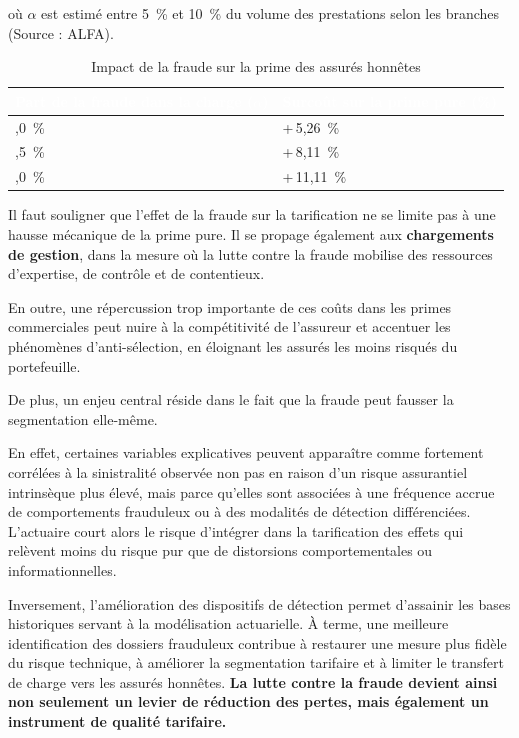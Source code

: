 où $\alpha$ est estimé entre 5~\% et 10~\% du volume des prestations selon les branches (Source : ALFA).

\begin{table}[H]
    \centering
    \renewcommand{\arraystretch}{1.4}
    \begin{tabularx}{\textwidth}{|>{\centering\arraybackslash}X|>{\centering\arraybackslash}X|}
        \hline
        \rowcolor{accenture}
        \textcolor{white}{\textbf{Part de la fraude dans la charge ($\alpha$)}} & \textcolor{white}{\textbf{Surcoût sur la prime pure (\%)}} \\
        \hline
        5,0~\% & +\,5,26~\% \\
        \hline
        7,5~\% & +\,8,11~\% \\
        \hline
        10,0~\% & +\,11,11~\% \\
        \hline
    \end{tabularx}
    \caption{Impact de la fraude sur la prime des assurés honnêtes}
    \label{tab:levier-fraude}
\end{table}

Il faut souligner que l'effet de la fraude sur la tarification ne se limite pas à une hausse mécanique de la prime pure. Il se propage également aux \textbf{chargements de gestion}, dans la mesure où la lutte contre la fraude mobilise des ressources d'expertise, de contrôle et de contentieux.

En outre, une répercussion trop importante de ces coûts dans les primes commerciales peut nuire à la compétitivité de l'assureur et accentuer les phénomènes d'anti-sélection, en éloignant les assurés les moins risqués du portefeuille.

De plus, un enjeu central réside dans le fait que la fraude peut fausser la segmentation elle-même.

En effet, certaines variables explicatives peuvent apparaître comme fortement corrélées à la sinistralité observée non pas en raison d'un risque assurantiel intrinsèque plus élevé, mais parce qu'elles sont associées à une fréquence accrue de comportements frauduleux ou à des modalités de détection différenciées. L'actuaire court alors le risque d'intégrer dans la tarification des effets qui relèvent moins du risque pur que de distorsions comportementales ou informationnelles.

Inversement, l'amélioration des dispositifs de détection permet d'assainir les bases historiques servant à la modélisation actuarielle. À terme, une meilleure identification des dossiers frauduleux contribue à restaurer une mesure plus fidèle du risque technique, à améliorer la segmentation tarifaire et à limiter le transfert de charge vers les assurés honnêtes. \textbf{La lutte contre la fraude devient ainsi non seulement un levier de réduction des pertes, mais également un instrument de qualité tarifaire.}

